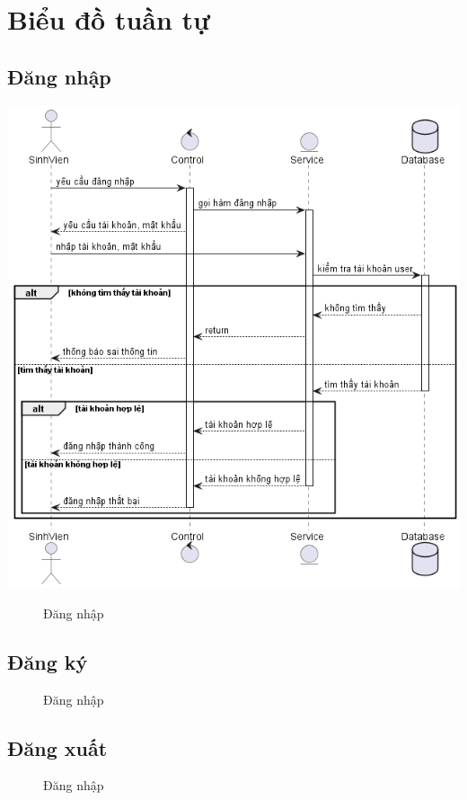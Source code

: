 \section{Biểu đồ tuần tự}
\subsection{Đăng nhập}
  \begin{center}
    \includegraphics[width=1.1\textwidth]{image/sequence/login.png}
    \begin{figure}
      \centering
      \caption{Đăng nhập}
    \end{figure}
  \end{center}

\subsection{Đăng ký}
  \begin{center}
    \begin{figure}
      \centering
      \caption{Đăng nhập}
    \end{figure}
  \end{center}

\subsection{Đăng xuất}
  \begin{center}
    \begin{figure}
      \centering
      \caption{Đăng nhập}
    \end{figure}
  \end{center}

